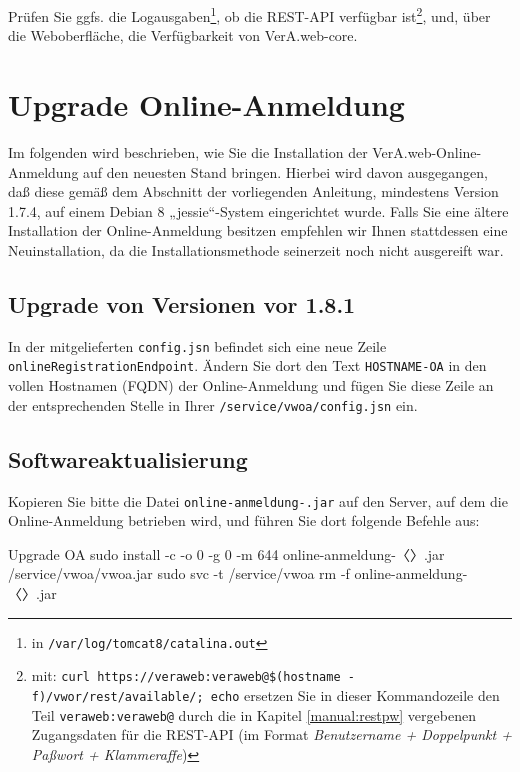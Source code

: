 Prüfen Sie ggfs. die Logausgaben\Hair\footnote{\label{fn:tomcatlogs}in
\texttt{/var/log/tomcat8/catalina.out}}, ob die REST-API verfügbar
ist\Hair\footnote{\label{fn:vworcheck}mit:
\texttt{curl https://veraweb:veraweb@\$(hostname -f)/vwor/rest/available/; echo}%
\dash ersetzen Sie in dieser Kommandozeile den Teil \texttt{veraweb:veraweb@}
durch die in Kapitel \ref{manual:restpw} vergebenen Zugangsdaten für die
REST-API (im Format {\itshape Benutzername + Doppelpunkt + Paßwort +
Klammeraffe})}, und, über die Weboberfläche, die Verfügbarkeit von
VerA.web-core.

\ifoa

\section{Upgrade Online-Anmeldung}\label{sec:upgrade-oa}

Im folgenden wird beschrieben, wie Sie die Installation der
VerA.web-Online-Anmeldung auf den neuesten Stand bringen.
Hierbei wird davon ausgegangen, daß diese gemäß
  dem Abschnitt  der vorliegenden Anleitung,
  mindestens Version 1.7.4,
auf einem Debian 8 „jessie“-System eingerichtet wurde.
Falls Sie eine ältere Installation der Online-Anmeldung besitzen
empfehlen wir Ihnen stattdessen eine Neuinstallation, da die
Installationsmethode seinerzeit noch nicht ausgereift war.

\subsection{Upgrade von Versionen vor 1.8.1}\label{subsec:upgrade-oa-181}

In der mitgelieferten \texttt{config.jsn} befindet sich eine neue
Zeile \texttt{onlineRegistrationEndpoint}. Ändern Sie dort den Text
\texttt{HOSTNAME-OA} in den vollen Hostnamen (FQDN) der Online-Anmeldung
und fügen Sie diese Zeile an der entsprechenden Stelle in Ihrer
\texttt{/service/vwoa/config.jsn} ein.

\subsection{Softwareaktualisierung}\label{subsec:upgrade-oa-software}

\begin{minipage}{\linewidth}
Kopieren Sie bitte die Datei \texttt{online-anmeldung-\vwiaverssw{}.jar}
auf den Server, auf dem die Online-Anmeldung betrieben wird, und führen
Sie dort folgende Befehle aus:

\begin{lstdump}{Upgrade OA}
sudo install -c -o 0 -g 0 -m 644 online-anmeldung-〈\lstdumpesc{\vwiaverssw}〉.jar /service/vwoa/vwoa.jar
sudo svc -t /service/vwoa
rm -f online-anmeldung-〈\lstdumpesc{\vwiaverssw}〉.jar
\end{lstdump}
\end{minipage}


